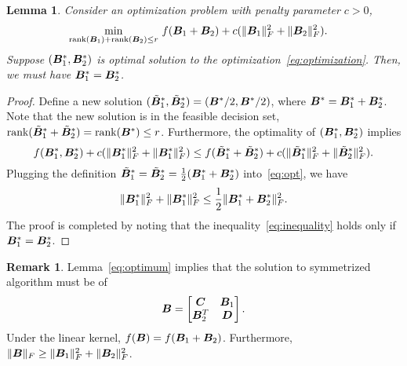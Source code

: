\documentclass[11pt]{article}
\theoremstyle{plain}
\newtheorem{lem}{Lemma}
\theoremstyle{definition}
\newtheorem{rmk}{Remark}
\begin{document}
\begin{enumerate}
\begin{lem}\label{eq:optimum}Consider an optimization problem with penalty parameter $c>0$,
\begin{align}\label{eq:optimization}
\min_{\text{rank}(\bm B_1)+\text{rank}(\bm B_2)\leq r}\ & f(\bm B_1+\bm B_2)+c(\lVert\bm B_1\rVert_F^2+\lVert\bm B_2\rVert_F^2).
\end{align}
Suppose $(\bm B^*_1, \bm B^*_2)$ is optimal solution to the optimization~\eqref{eq:optimization}. Then, we must have $\bm B^*_1=\bm B^*_2$. 
\end{lem}
\begin{proof}
Define a new solution $(\tilde {\bm B}^*_1, \tilde{\bm B}^*_2) = (\bm B^*/2, \bm B^*/2)$, where $\bm B^*=\bm B^*_1+\bm B^*_2$. Note that the new solution is in the feasible decision set, $\text{rank}(\tilde {\bm B}^*_1+\tilde{\bm B}^*_2)=\text{rank}(\bm B^*)\leq r$. Furthermore, the optimality of $(\bm B^*_1, \bm B^*_2)$ implies 
\begin{equation}\label{eq:opt}
 f(\bm B^*_1, \bm B^*_2) + c(\lVert\bm B^*_1\rVert_F^2+\lVert\bm B^*_1\rVert_F^2) \leq f(\tilde {\bm B}^*_1+ \tilde{\bm B}^*_2) + c(\lVert\tilde {\bm B}^*_1\rVert_F^2+\lVert\tilde{\bm B}^*_2\rVert_F^2).
\end{equation}
Plugging the definition $\tilde {\bm B}^*_1=\tilde {\bm B}^*_2={1\over 2}({\bm B^*_1+\bm B^*_2)}$ into~\eqref{eq:opt}, we have
\begin{equation}\label{eq:inequality}
\lVert\bm B^*_1\rVert_F^2+\lVert\bm B^*_1\rVert_F^2 \leq {1\over 2}\lVert\bm B^*_1+\bm B^*_2\rVert_F^2. 
\end{equation}
The proof is completed by noting that the inequality~\eqref{eq:inequality} holds only if $\bm B^*_1=\bm B^*_2$.
\end{proof}

\begin{rmk}Lemma~\eqref{eq:optimum} implies that the solution to symmetrized algorithm must be of 
\[
\bm B=\begin{bmatrix}
\bm C & \bm B_1\\
\bm B^T_2&\bm{D}\\
\end{bmatrix}.
\]
Under the linear kernel, $f(\bm B)=f(\bm B_1+\bm B_2)$. Furthermore, $\lVert\bm B\rVert_F\geq \lVert\bm B_1\rVert_F^2+\lVert\bm B_2\rVert_F^2$. 
\end{rmk}



\end{enumerate}
\end{document}
